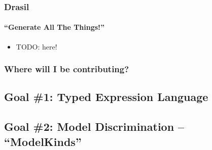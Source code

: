 \documentclass{beamer}
\begin{document}
\begin{frame}
    \frametitle{Drasil}
    \framesubtitle{``Generate All The Things!''}
    
    \begin{itemize}
        \item TODO: here!
    \end{itemize}
\end{frame}

\begin{frame}
    \frametitle{}
    
\end{frame}

\begin{frame}
    \frametitle{}
    
\end{frame}

\begin{frame}
    \frametitle{}
    
\end{frame}

\begin{frame}
    \frametitle{}
    
\end{frame}

\begin{frame}
    \frametitle{Where will I be contributing?}
\end{frame}

\subsection{Goal \#1: Typed Expression Language}

\subsection{Goal \#2: Model Discrimination -- ``ModelKinds''}
\end{document}

